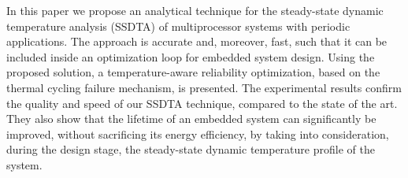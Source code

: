 In this paper we propose an analytical technique for the steady-state dynamic temperature analysis (SSDTA) of multiprocessor systems with periodic applications. The approach is accurate and, moreover, fast, such that it can be included inside an optimization loop for embedded system design. Using the proposed solution, a temperature-aware reliability optimization, based on the thermal cycling failure mechanism, is presented. The experimental results confirm the quality and speed of our SSDTA technique, compared to the state of the art. They also show that the lifetime of an embedded system can significantly be improved, without sacrificing its energy efficiency, by taking into consideration, during the design stage, the steady-state dynamic temperature profile of the system.
